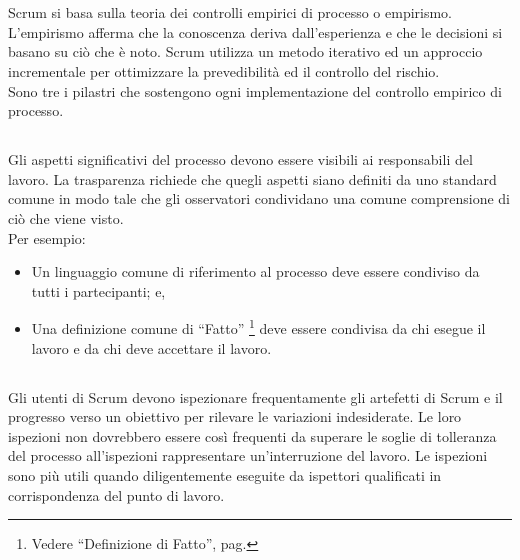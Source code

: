 
\section*{\color{Blue}{La Teoria di Scrum}}
\label{sec:scrum_theory}
Scrum si basa sulla teoria dei controlli empirici di processo o empirismo. L'empirismo afferma che la conoscenza deriva dall'esperienza e 
che le decisioni si basano su ci\`o che \`e noto. Scrum utilizza un metodo iterativo ed un approccio incrementale per ottimizzare la 
prevedibilit\`a ed il controllo del rischio. 
\newline
\\Sono tre i pilastri che sostengono ogni implementazione del controllo empirico di processo.

\subsection*{\color{SteelBlue}{Trasparenza}}
\label{sec:transparency}
Gli aspetti significativi  del processo devono essere visibili ai responsabili del lavoro. La trasparenza richiede che quegli aspetti siano 
definiti da uno standard comune in modo tale che gli osservatori condividano una comune comprensione di ci\`o che viene visto.
\newline
\\Per esempio:
\begin{itemize}
	\item Un linguaggio comune di riferimento al processo deve essere condiviso da tutti i partecipanti; e,
	\item Una definizione comune di ``Fatto'' \footnote[1]{Vedere ``Definizione di Fatto'', pag. \pageref{sec:definition_of_done}} deve essere condivisa da chi esegue il lavoro e da chi deve accettare il lavoro.
\end{itemize}

\subsection*{\color{SteelBlue}{Ispezione}}
\label{sec:inspection}
Gli utenti di Scrum devono ispezionare frequentamente gli artefetti di Scrum e il progresso verso un obiettivo per rilevare le variazioni
indesiderate. Le loro ispezioni non dovrebbero essere cos\`i frequenti da superare le soglie di tolleranza del processo all'ispezioni
rappresentare un'interruzione del lavoro. Le ispezioni sono pi\`u utili quando diligentemente eseguite da ispettori qualificati in 
corrispondenza del punto di lavoro.

